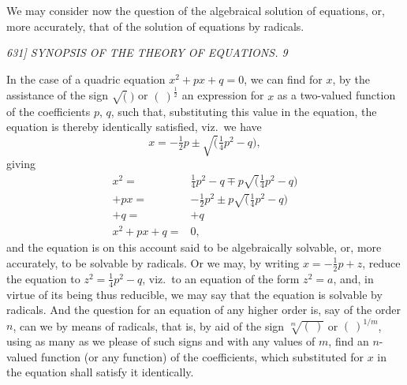 \documentclass[12pt,a4paper]{article}
\begin{document}
We may consider now the question of the algebraical solution of equations, or, more accurately, that of the solution of equations by radicals.

\clearpage
\setcounter{page}{9}

\begin{center}
\textit{631] \hfill SYNOPSIS OF THE THEORY OF EQUATIONS. \hfill 9}
\end{center}

In the case of a quadric equation $x^2 + p x + q = 0$, we can find for $x$, by the assistance of the sign $\surd(\ )$ or $(\ )^{\frac{1}{2}}$ an expression for $x$ as a two-valued function of the coefficients $p$, $q$, such that, substituting this value in the equation, the equation is thereby identically satisfied, viz.\ we have
\[
x = -\tfrac{1}{2}p \pm \surd(\tfrac{1}{4}p^2 - q),
\]
giving
\[
\begin{array}{rl}
x^2 = & \tfrac{1}{4}p^2 - q \mp p\surd(\tfrac{1}{4}p^2 - q) \\
+ p x = & -\tfrac{1}{2}p^2 \pm p\surd(\tfrac{1}{4}p^2 - q) \\
+ q = & +q \\ \hline
x^2 + p x + q = & 0,
\end{array}
\]
and the equation is on this account said to be algebraically solvable, or, more accurately, to be solvable by radicals. Or we may, by writing $x = -\tfrac{1}{2}p + z$, reduce the equation to $z^2 = \tfrac{1}{4}p^2 - q$, viz.\ to an equation of the form $z^2 = a$, and, in virtue of its being thus reducible, we may say that the equation is solvable by radicals. And the question for an equation of any higher order is, say of the order $n$, can we by means of radicals, that is, by aid of the sign $\sqrt[m]{(\ )}$ or $(\ )^{1/m}$, using as many as we please of such signs and with any values of $m$, find an $n$-valued function (or any function) of the coefficients, which substituted for $x$ in the equation shall satisfy it identically.
\end{document}

